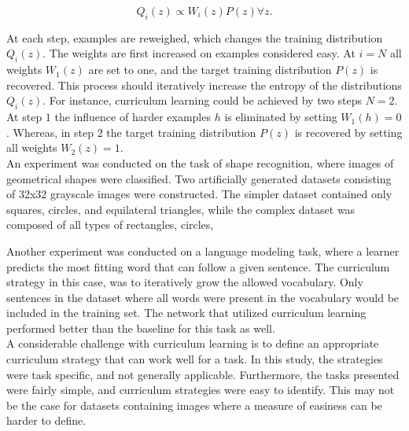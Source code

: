 $$Q_{i}(z)\propto W_{i}(z)P(z)\forall z.$$

At each step, examples are reweighed, which changes the training distribution $Q_{i}(z)$. The weights are first increased on examples considered easy.  
At $i=N$ all weights $W_{1}(z)$ are set to one, and the target training distribution $P(z)$ is recovered. This process should iteratively increase the entropy of the distributions $Q_{i}(z)$. For instance, curriculum learning could be achieved by two steps $N=2$. At step $1$ the influence of harder examples $h$ is eliminated by setting $W_{1}(h) = 0$. Whereas, in step $2$ the target training distribution $P(z)$ is recovered by setting all weights $W_{2}(z) = 1$.\\


An experiment was conducted on the task of shape recognition, where images of geometrical shapes were classified. Two artificially generated datasets consisting of 32x32 grayscale images were constructed. The simpler dataset contained only squares, circles, and equilateral triangles, while the complex dataset was composed of all types of rectangles, circles,%

Another experiment was conducted on a language modeling task, where a learner predicts the most fitting word that can follow a given sentence. The curriculum strategy in this case, was to iteratively grow the allowed vocabulary. Only sentences in the dataset where all words were present in the vocabulary would be included in the training set. The network that utilized curriculum learning performed better than the baseline for this task as well.\\

A considerable challenge with curriculum learning is to define an appropriate curriculum strategy that can work well for a task. In this study, the strategies were task specific, and not generally applicable. Furthermore, the tasks presented were fairly simple, and curriculum strategies were easy to identify. This may not be the case for datasets containing images where a measure of easiness can be harder to define.\\



